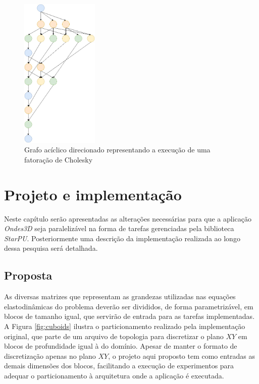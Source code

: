 \documentclass[cic,tc]{iiufrgs}
\begin{document}
\begin{figure}[!htb]
    \caption{Grafo acíclico direcionado representando a execução de uma fatoração de Cholesky}
    \begin{center}
      \includegraphics[width=10em]{dag_starpu}
    \end{center}
    \label{fig:dag_starpu}
\end{figure}

\chapter{Projeto e implementação}\label{sec:project}
Neste capítulo serão apresentadas as alterações necessárias para que a aplicação \textit{Ondes3D} seja paralelizável na forma de tarefas gerenciadas pela biblioteca \textit{StarPU}.
Posteriormente uma descrição da implementação realizada ao longo dessa pesquisa será detalhada.

\section{Proposta}\label{sec:proposal}

As diversas matrizes que representam as grandezas utilizadas nas equações elastodinâmicas do problema deverão ser divididos, de forma parametrizável, em blocos de tamanho igual, que servirão
de entrada para as tarefas implementadas. A Figura \ref{fig:cuboids} ilustra o particionamento realizado pela implementação original, que parte de um arquivo de topologia para discretizar o plano $XY$ em blocos de profundidade igual à do domínio. Apesar de manter o formato de
discretização apenas no plano $XY$, o projeto aqui proposto tem como entradas as demais dimensões dos blocos, facilitando a execução de experimentos para adequar o particionamento à arquitetura onde a aplicação é executada.
\end{document}
